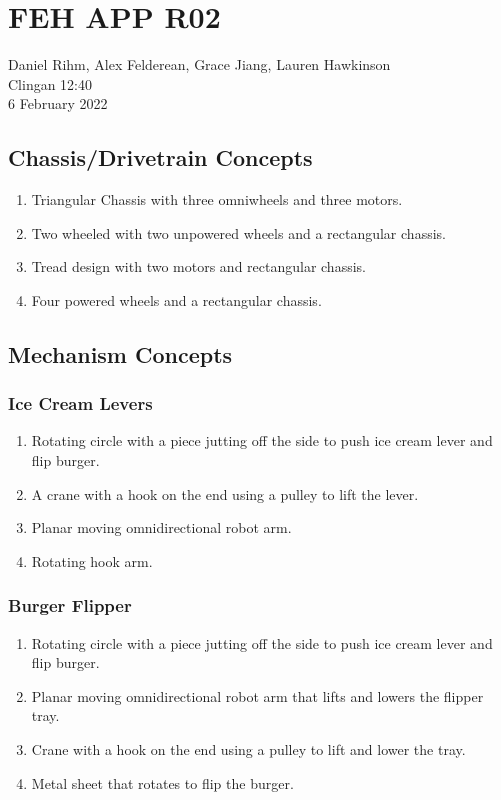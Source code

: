 \documentclass[12pt]{extarticle}
\begin{document}
\section*{FEH APP R02}

Daniel Rihm, Alex Felderean, Grace Jiang, Lauren Hawkinson\\
Clingan 12:40\\
6 February 2022

\subsection*{Chassis/Drivetrain Concepts}
\begin{enumerate}
    \item Triangular Chassis with three omniwheels and three motors.
    \item Two wheeled with two unpowered wheels and a rectangular chassis.
    \item Tread design with two motors and rectangular chassis.
    \item Four powered wheels and a rectangular chassis.
\end{enumerate}

\subsection*{Mechanism Concepts}
\subsubsection*{Ice Cream Levers}
\begin{enumerate}
    \item Rotating circle with a piece jutting off the side to push ice cream lever and flip burger.
    \item A crane with a hook on the end using a pulley to lift the lever.
    \item Planar moving omnidirectional robot arm.
    \item Rotating hook arm.
\end{enumerate}

\subsubsection*{Burger Flipper}
\begin{enumerate}
    \item Rotating circle with a piece jutting off the side to push ice cream lever and flip burger.
    \item Planar moving omnidirectional robot arm that lifts and lowers the flipper tray.
    \item Crane with a hook on the end using a pulley to lift and lower the tray.
    \item Metal sheet that rotates to flip the burger.
\end{enumerate}
\end{document}

